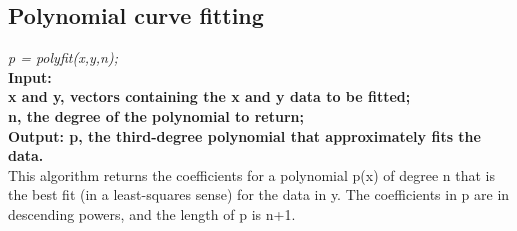 \subsection{Polynomial curve fitting}
\vspace{3mm}
\textit{p = polyfit(x,y,n);}\\
\newline
\textbf{Input: \\x and y, vectors containing the x and y data to be fitted;\\ n, the degree of the polynomial to return;}\\ 
\textbf{Output: p, the third-degree polynomial that approximately fits the data.}\\
\newline
This algorithm returns the coefficients for a polynomial p(x) of degree n that is the best fit (in a least-squares sense) for the data in y. The coefficients in p are in descending powers, and the length of p is n+1.



